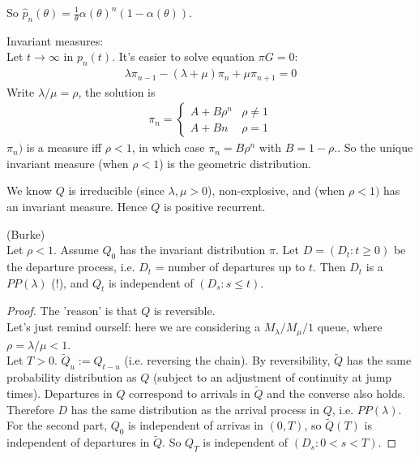 \documentclass[a4paper]{article}
\begin{document}
So $\hat{p}_n(\theta) = \frac{1}{\theta} \alpha(\theta)^n (1-\alpha(\theta))$.

Invariant measures:\\
Let $t \to \infty$ in $p_n(t)$. It's easier to solve equation $\pi G = 0$:
\begin{equation*}
\begin{aligned}
\lambda \pi_{n-1} - (\lambda+\mu) \pi_n + \mu \pi_{n+1} = 0
\end{aligned}
\end{equation*}
Write $\lambda/\mu = \rho$, the solution is
\begin{equation*}
\begin{aligned}
\pi_n = \left\{ \begin{array}{ll}
A+B \rho^n & \rho \neq 1\\
A+Bn & \rho=1
\end{array}
\right.
\end{aligned}
\end{equation*}
$\pi_n)$ is a measure iff $\rho < 1$, in which case $\pi_n = B\rho^n$ with $B = 1-\rho$.. So the unique invariant measure (when $\rho<1$) is the geometric distribution.

We know $Q$ is irreducible (since $\lambda,\mu>0$), non-explosive, and (when $\rho<1)$ has an invariant measure. Hence $Q$ is positive recurrent.

\begin{thm} (Burke)\\
Let $\rho < 1$. Assume $Q_0$ has the invariant distribution $\pi$. Let $D = (D_t:t \geq 0)$ be the departure process, i.e. $D_t$ = number of departures up to $t$. Then $D_t$ is a $PP(\lambda)$ (!), and $Q_t$ is independent of $(D_s:s \leq t)$. 
\begin{proof}
The 'reason' is that $Q$ is reversible.\\
Let's just remind ourself: here we are considering a $M_\lambda/M_\mu/1$ queue, where $\rho = \lambda/\mu < 1$.\\
Let $T>0$. $\tilde{Q}_u := Q_{t-u}$ (i.e. reversing the chain). By reversibility, $\tilde{Q}$ has the same probability distribution as $Q$ (subject to an adjustment of continuity at jump times). Departures in $Q$ correspond to arrivals in $\tilde{Q}$ and the converse also holds. Therefore $D$ has the same distribution as the arrival process in $Q$, i.e. $PP(\lambda)$.\\
For the second part, $Q_0$ is independent of arrivas in $(0,T)$, so $\tilde{Q}(T)$ is independent of departures in $\tilde{Q}$. So $Q_T$ is independent of $(D_s:0<s<T)$.
\end{proof}
\end{thm}
\end{document}
